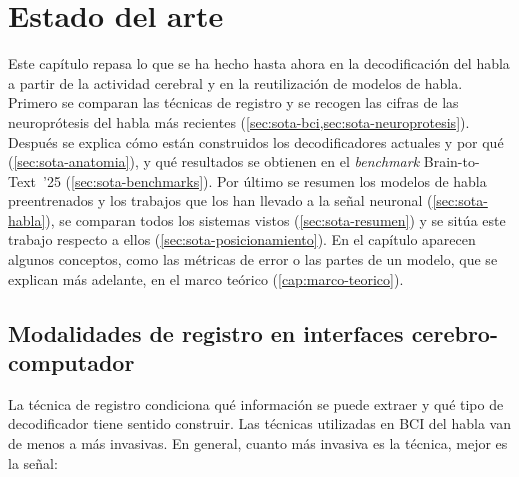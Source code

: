 
\chapter{Estado del arte}
\label{cap:estado-del-arte}

Este capítulo repasa lo que se ha hecho hasta ahora en la decodificación del habla a partir de la actividad cerebral y en la reutilización de modelos de habla. Primero se comparan las técnicas de registro y se recogen las cifras de las neuroprótesis del habla más recientes (\cref{sec:sota-bci,sec:sota-neuroprotesis}). Después se explica cómo están construidos los decodificadores actuales y por qué (\cref{sec:sota-anatomia}), y qué resultados se obtienen en el \textit{benchmark} Brain-to-Text~'25 (\cref{sec:sota-benchmarks}). Por último se resumen los modelos de habla preentrenados y los trabajos que los han llevado a la señal neuronal (\cref{sec:sota-habla}), se comparan todos los sistemas vistos (\cref{sec:sota-resumen}) y se sitúa este trabajo respecto a ellos (\cref{sec:sota-posicionamiento}). En el capítulo aparecen algunos conceptos, como las métricas de error o las partes de un modelo, que se explican más adelante, en el marco teórico (\cref{cap:marco-teorico}).

\section{Modalidades de registro en interfaces cerebro-computador}
\label{sec:sota-bci}

La técnica de registro condiciona qué información se puede extraer y qué tipo de decodificador tiene sentido construir. Las técnicas utilizadas en BCI del habla van de menos a más invasivas. En general, cuanto más invasiva es la técnica, mejor es la señal:

